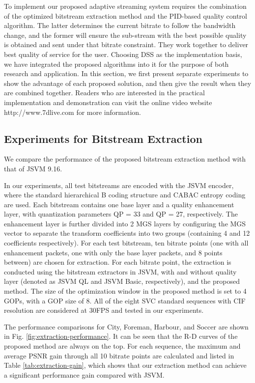 \documentclass[journal]{IEEEtran}
\begin{document}
To implement our proposed adaptive streaming system requires the combination of the optimized bitstream extraction method and the PID-based quality control algorithm. The latter determines the current bitrate to follow the bandwidth change, and the former will ensure the sub-stream with the best possible quality is obtained and sent under that bitrate constraint. They work together to deliver best quality of service for the user. Choosing DSS as the implementation basis, we have integrated the proposed algorithms into it for the purpose of both research and application. In this section, we first present separate experiments to show the advantage of each proposed solution, and then give the result when they are combined together. Readers who are interested in the practical implementation and demonstration can visit the online video website http://www.7dlive.com for more information.

\subsection{Experiments for Bitstream Extraction}

We compare the performance of the proposed bitstream extraction method with that of JSVM 9.16.

In our experiments, all test bitstreams are encoded with the JSVM encoder, where the standard hierarchical B coding structure and CABAC entropy coding are used. Each bitstream contains one base layer and a quality enhancement layer, with quantization parameters QP = 33 and QP = 27, respectively. The enhancement layer is further divided into 2 MGS layers by configuring the MGS vector to separate the transform coefficients into two groups (containing 4 and 12 coefficients respectively). For each test bitstream, ten bitrate points (one with all enhancement packets, one with only the base layer packets, and 8 points between) are chosen for extraction. For each bitrate point, the extraction is conducted using the bitstream extractors in JSVM, with and without quality layer (denoted as JSVM QL and JSVM Basic, respectively), and the proposed method. The size of the optimization window in the proposed method is set to 4 GOPs, with a GOP size of 8. All of the eight SVC standard sequences with CIF resolution are considered at 30FPS and tested in our experiments.

The performance comparisons for City, Foreman, Harbour, and Soccer are shown in Fig. \ref{fig:extraction-performance}. It can be seen that the R-D curves of the proposed method are always on the top. For each sequence, the maximum and average PSNR gain through all 10 bitrate points are calculated and listed in Table \ref{tab:extraction-gain}, which shows that our extraction method can achieve a significant performance gain compared with JSVM.
\end{document}
